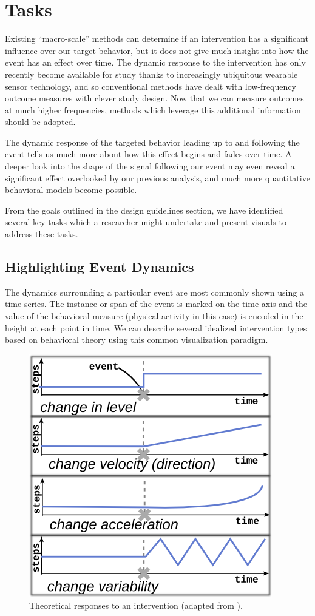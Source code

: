 \section{Tasks}
Existing “macro-scale” methods can determine if an intervention has a significant influence over our target behavior, but it does not give much insight into how the event has an effect over time.
The dynamic response to the intervention has only recently become available for study thanks to increasingly ubiquitous wearable sensor technology, and so conventional methods have dealt with low-frequency outcome measures with clever study design.
Now that we can measure outcomes at much higher frequencies, methods which leverage this additional information should be adopted.

The dynamic response of the targeted behavior leading up to and following the event tells us much  more about how this effect begins and fades over time.
A deeper look into the shape of the signal following our event may even reveal a significant effect overlooked by our previous analysis, and much more quantitative behavioral models become possible.

From the goals outlined in the design guidelines section, we have identified several key tasks which a researcher might undertake and present visuals to address these tasks.

\subsection{Highlighting Event Dynamics}
The dynamics surrounding a particular event are most commonly shown using a time series.
The instance or span of the event is marked on the time-axis and the value of the behavioral measure (physical activity in this case) is encoded in the height at each point in time.
We can describe several idealized intervention types based on behavioral theory using this common visualization paradigm.

\begin{figure}
\centering
\includegraphics[width=0.6\columnwidth]{./img/exampleDynamicSignals.png}
\caption{Theoretical responses to an intervention (adapted from \cite{glass1975}).}
\label{fig:exampleSignals}
\end{figure}

